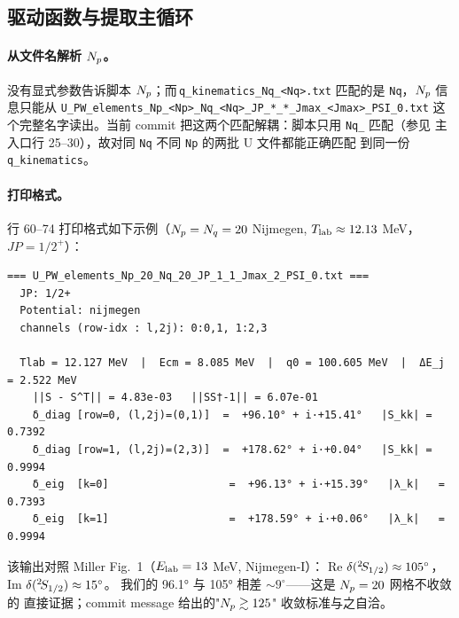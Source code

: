 \subsection{驱动函数与提取主循环}
\label{subsec:ch14-py-driver}



\paragraph{从文件名解析 \(N_p\)。}
没有显式参数告诉脚本 \(N_p\)；而\(\,\)\texttt{q\_kinematics\_Nq\_<Nq>.txt}
匹配的是 \texttt{Nq}，\(N_p\) 信息只能从 \texttt{U\_PW\_elements\_Np\_<Np>\_Nq\_<Nq>\_JP\_*\_*\_Jmax\_<Jmax>\_PSI\_0.txt}
这个完整名字读出。当前 commit 把这两个匹配解耦：脚本只用 \texttt{Nq\_}
匹配（参见
主入口行 25--30），故对同 \texttt{Nq} 不同 \texttt{Np} 的两批 U 文件都能正确匹配
到同一份 \texttt{q\_kinematics}。

\paragraph{打印格式。}
行 60--74 打印格式如下示例（\(N_p = N_q = 20\) Nijmegen, \({T_{\text{lab}}} \approx 12.13\) MeV，
\(JP = 1/2^+\)）：
\begin{verbatim}
=== U_PW_elements_Np_20_Nq_20_JP_1_1_Jmax_2_PSI_0.txt ===
  JP: 1/2+
  Potential: nijmegen
  channels (row-idx : l,2j): 0:0,1, 1:2,3

  Tlab = 12.127 MeV  |  Ecm = 8.085 MeV  |  q0 = 100.605 MeV  |  ΔE_j = 2.522 MeV
    ||S - S^T|| = 4.83e-03   ||SS†-1|| = 6.07e-01
    δ_diag [row=0, (l,2j)=(0,1)]  =  +96.10° + i·+15.41°   |S_kk| = 0.7392
    δ_diag [row=1, (l,2j)=(2,3)]  =  +178.62° + i·+0.04°   |S_kk| = 0.9994
    δ_eig  [k=0]                   =  +96.13° + i·+15.39°   |λ_k|   = 0.7393
    δ_eig  [k=1]                   =  +178.59° + i·+0.06°   |λ_k|   = 0.9994
\end{verbatim}
该输出对照 Miller Fig.~1（\(E_{\rm lab} = 13\) MeV, Nijmegen-I）：
Re \(\delta({}^{2}\!S_{1/2}) \approx 105^\circ\)，
Im \(\delta({}^{2}\!S_{1/2}) \approx 15^\circ\)。
我们的 96.1° 与 105° 相差 \(\sim 9^\circ\)——这是 \(N_p = 20\) 网格不收敛的
直接证据；commit message 给出的"\(N_p \gtrsim 125\)" 收敛标准与之自洽。

